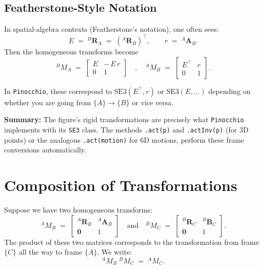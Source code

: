 \documentclass[10pt]{article}
\begin{document}
\subsection*{Featherstone-Style Notation}
In spatial-algebra contexts (Featherstone’s notation), one often sees:
\[
E 
\;=\;
{}^{B}\mathbf{R}_{A}
\;=\;
({}^{A}\mathbf{R}_{B})^\top,
\qquad
r 
\;=\;
{}^{A}\mathbf{A}_{B}.
\]
Then the homogeneous transforms become
\[
{}^{B}\!M_{A}
\;=\;
\begin{bmatrix}
E & -\,E\,r \\[3pt]
0 & 1
\end{bmatrix}
\quad,\quad
{}^{A}\!M_{B}
\;=\;
\begin{bmatrix}
E^\top & r \\[3pt]
0 & 1
\end{bmatrix}.
\]

In \texttt{Pinocchio}, these correspond to \(\mathrm{SE3}(E^\top, r)\) or \(\mathrm{SE3}(E, \dots)\) depending on whether you are going from \(\{A\}\to\{B\}\) or vice versa.

\vspace*{1em}
\noindent
\textbf{Summary:}  
The figure’s rigid transformations are precisely what \texttt{Pinocchio} implements with its \texttt{SE3} class.  The methods \texttt{.act(p)} and \texttt{.actInv(p)} (for 3D points) or the analogous \texttt{.act(motion)} for 6D motions, perform these frame conversions automatically.






\section*{Composition of Transformations}

Suppose we have two homogeneous transforms:
\[
{}^{A}\!M_{B}
\;=\;
\begin{bmatrix}
{}^{A}\mathbf{R}_{B} & {}^{A}\mathbf{A}_{B} \\[3pt]
\mathbf{0} & 1
\end{bmatrix}
\quad\text{and}\quad
{}^{B}\!M_{C}
\;=\;
\begin{bmatrix}
{}^{B}\mathbf{R}_{C} & {}^{B}\mathbf{B}_{C} \\
\mathbf{0} & 1
\end{bmatrix}.
\]
The product of these two matrices corresponds to the transformation from frame \(\{C\}\) all the way to frame \(\{A\}\).  We write:
\[
{}^{A}\!M_{B}\;{}^{B}\!M_{C}
\;=\;
{}^{A}\!M_{C}.
\]
\end{document}
